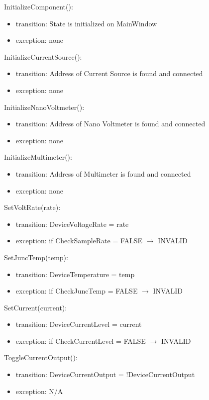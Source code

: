 \documentclass[12pt, titlepage]{article}
\begin{document}
\noindent InitializeComponent():
\begin{itemize}
\item transition: State is initialized on MainWindow
\item exception: none
\end{itemize}

\noindent InitializeCurrentSource():
\begin{itemize}
\item transition: Address of Current Source is found and connected
\item exception: none
\end{itemize}

\noindent InitializeNanoVoltmeter():
\begin{itemize}
\item transition: Address of Nano Voltmeter is found and connected
\item exception: none
\end{itemize}

\noindent InitializeMultimeter():
\begin{itemize}
\item transition: Address of Multimeter is found and connected
\item exception: none
\end{itemize}

\noindent SetVoltRate(rate):
\begin{itemize}
\item transition: DeviceVoltageRate = rate
\item exception: if CheckSampleRate = FALSE $\rightarrow$ INVALID
\end{itemize}

\noindent SetJuncTemp(temp):
\begin{itemize}
\item transition: DeviceTemperature = temp
\item exception: if CheckJuncTemp = FALSE $\rightarrow$ INVALID
\end{itemize}

\noindent SetCurrent(current):
\begin{itemize}
\item transition: DeviceCurrentLevel = current
\item exception: if CheckCurrentLevel = FALSE $\rightarrow$ INVALID
\end{itemize}

\noindent ToggleCurrentOutput():
\begin{itemize}
\item transition: DeviceCurrentOutput = !DeviceCurrentOutput
\item exception: N/A
\end{itemize}
\end{document}

